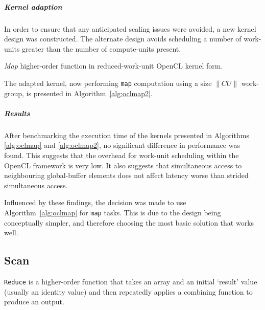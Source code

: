 \subparagraph*{Kernel adaption}
In order to ensure that any anticipated scaling issues were avoided, a new kernel design was constructed. The alternate design avoids scheduling a number of work-units greater than the number of compute-units present.

\begin{algorithm}
  \caption{\emph{Map} higher-order function in reduced-work-unit OpenCL kernel form.}
  \label{alg:oclmap2}

  \begin{algorithmic}


      \EndFor
    \EndFunction
  \end{algorithmic}
\end{algorithm}

The adapted kernel, now performing \verb|map| computation using a size $\|CU\|$ work-group, is presented in Algorithm~\ref{alg:oclmap2}.

\subparagraph*{Results}
After benchmarking the execution time of the kernels presented in Algorithms \ref{alg:oclmap} and \ref{alg:oclmap2}, no significant difference in performance was found. This suggests that the overhead for work-unit scheduling within the \ac{OpenCL} framework is very low. It also suggests that simultaneous access to neighbouring global-buffer elements does not affect latency worse than strided simultaneous access.

Influenced by these findings, the decision was made to use Algorithm~\ref{alg:oclmap} for \verb|map| tasks. This is due to the design being conceptually simpler, and therefore choosing the most basic solution that works well.

\subsection{Scan}
\verb|Reduce| is a higher-order function that takes an array and an initial `result' value (usually an identity value) and then repeatedly applies a combining function to produce an output.

